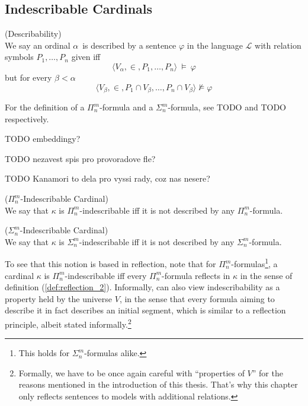 \subsection{Indescribable Cardinals}


\begin{definition}{(Describability)}\label{def:describability}\\
We say an ordinal $\alpha$ is described by a sentence $\varphi$ in the language $\mathscr{L}$ with relation symbols $P_1, \ldots, P_n$ given iff
\begin{equation}
\langle V_\alpha, \in, P_1, \ldots, P_n \rangle~\models~\varphi
\end{equation}
but for every $\beta < \alpha$
\begin{equation}
\langle V_\beta, \in, P_1 \cap V_\beta, \ldots, P_n \cap V_\beta \rangle \not\models \varphi
\end{equation}
\end{definition}

For the definition of a $\Pi^m_n$-formula and a $\Sigma^m_n$-formula, see TODO and TODO respectively.

TODO embeddingy?

TODO nezavest spis pro provoradove fle?

TODO Kanamori to dela pro vyssi rady, coz nas nesere?

\begin{definition}{($\Pi^m_n$-Indescribable Cardinal)}\label{def:pi_mn_indescribable}\\
We say that $\kappa$ is $\Pi^m_n$-indescribable iff it is not described by any $\Pi^m_n$-formula.
\end{definition}
\begin{definition}{($\Sigma^m_n$-Indescribable Cardinal)}\label{def:sigma_mn_indescribable}\\
We say that $\kappa$ is $\Sigma^m_n$-indescribable iff it is not described by any $\Sigma^m_n$-formula.
\end{definition}

To see that this notion is based in reflection, note that for $\Pi^m_n$-formulas\footnote{This holds for $\Sigma^m_n$-formulas alike.}, a cardinal $\kappa$ is $\Pi^m_n$-indescribable iff every $\Pi^m_n$-formula reflects in $\kappa$ in the sense of definition (\ref{def:reflection_2}). Informally, can also view indescribability as a property held by the universe $V$, in the sense that every formula aiming to describe it in fact describes an initial segment, which is similar to a reflection principle, albeit stated informally.\footnote{Formally, we have to be once again careful with ``properties of $V$'' for the reasons mentioned in the introduction of this thesis. That's why this chapter only reflects sentences to models with additional relations.}

